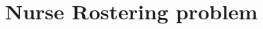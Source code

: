 \documentclass[../../thesis.tex]{subfiles}
\begin{document}
\section{Nurse Rostering problem}
\end{document}
